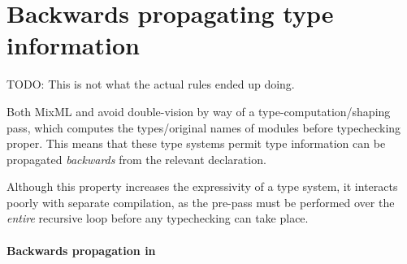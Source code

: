 \section{Backwards propagating type information}

TODO: This is not what the actual rules ended up doing.

Both MixML and \OldBackpack{} avoid double-vision by way of a
type-computation/shaping pass, which computes the types/original names
of modules before typechecking proper.  This means that these
type systems permit type information can be propagated \emph{backwards}
from the relevant declaration.

Although this property increases the expressivity of a type
system, it interacts poorly with separate compilation, as the
pre-pass must be performed over the \emph{entire} recursive loop
before any typechecking can take place.

\paragraph{Backwards propagation in \OldBackpack{}}

